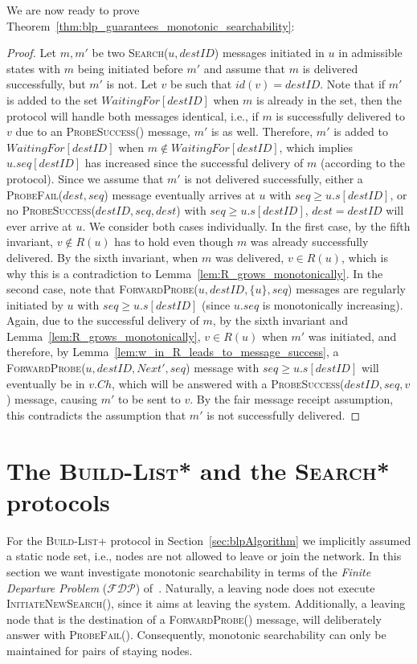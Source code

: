 \documentclass[a4paper,USenglish]{lipics}
\newcommand{\blp}{\textsc{Build-List+}\xspace}
\newcommand{\blpp}{\textsc{Build-List*}\xspace}
\newcommand{\srpp}{\textsc{Search*}\xspace}
\newcommand{\search}[1]{\textsc{Search(\ensuremath{#1})}\xspace}
\newcommand{\initsearch}[1]{\textsc{InitiateNewSearch(\ensuremath{#1})}\xspace}
\newcommand{\forwardprobe}[1]{\textsc{ForwardProbe(\ensuremath{#1})}\xspace}
\newcommand{\psuccess}[1]{\textsc{ProbeSuccess(\ensuremath{#1})}\xspace}
\newcommand{\pfail}[1]{\textsc{ProbeFail(\ensuremath{#1})}\xspace}
\newcommand{\fdp}{$\mathcal{FDP}$\xspace}
\begin{document}
We are now ready to prove Theorem~\ref{thm:blp_guarantees_monotonic_searchability}:
\begin{proof}
  Let $m, m'$ be two \search{u,destID} messages initiated in $u$ in admissible states with $m$ being initiated before $m'$ and assume that $m$ is delivered successfully, but $m'$ is not.
	Let $v$ be such that $id(v) = destID$.
Note that if $m'$ is added to the set $WaitingFor[destID]$ when $m$ is already in the set, then the protocol will handle both messages identical, i.e., if $m$ is successfully delivered to $v$ due to an \psuccess{} message, $m'$ is as well.
	Therefore, $m'$ is added to $WaitingFor[destID]$ when $m \notin WaitingFor[destID]$, which implies $u.seq[destID]$ has increased since the successful delivery of $m$ (according to the protocol).
	Since we assume that $m'$ is not delivered successfully, either a \pfail{dest,seq} message eventually arrives at $u$ with $seq \geq u.s[destID]$, or no \psuccess{destID,seq,dest} with $seq \geq u.s[destID]$, $dest = destID$ will ever arrive at $u$. 
	We consider both cases individually.
	In the first case, by the fifth invariant, $v \notin R(u)$ has to hold even though $m$ was already successfully delivered.
	By the sixth invariant, when $m$ was delivered, $v \in R(u)$, which is why this is a contradiction to Lemma~\ref{lem:R_grows_monotonically}.
	In the second case, note that \forwardprobe{u,destID,\{u\},seq} messages are regularly initiated by $u$ with $seq \geq u.s[destID]$ (since $u.seq$ is monotonically increasing).
	Again, due to the successful delivery of $m$, by the sixth invariant and Lemma~\ref{lem:R_grows_monotonically}, $v \in R(u)$ when $m'$ was initiated, and therefore, by Lemma~\ref{lem:w_in_R_leads_to_message_success}, a \forwardprobe{u, destID, Next', seq} message with $seq \geq u.s[destID]$ will eventually be in $v.Ch$, which will be answered with a \psuccess{destID, seq, v} message, causing $m'$ to be sent to $v$.	
	By the fair message receipt assumption, this contradicts the assumption that $m'$ is not successfully delivered.
\end{proof}


\section{The \blpp and the \srpp protocols}
\label{sec:theBLPPAlgorithm}
For the \blp protocol in Section~\ref{sec:blpAlgorithm} we implicitly assumed a static node set, i.e., nodes are not allowed to leave or join the network. In this section we want investigate monotonic searchability in terms of the \emph{Finite Departure Problem} (\fdp) of~\cite{departure1}.
Naturally, a leaving node does not execute \initsearch{}, since it aims at leaving the system. Additionally, a leaving node that is the destination of a \forwardprobe{} message, will deliberately answer with \pfail{}.
Consequently, monotonic searchability can only be maintained for pairs of staying nodes.
\end{document}
